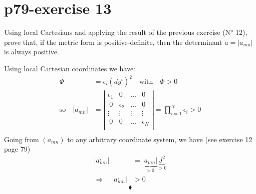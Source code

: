 \section{p79-exercise 13}
\begin{tcolorbox}
Using local Cartesians and applying the result of the previous exercise (N° 12), prove that, if the metric form is positive-definite, then the determinant $a= \left | a_{mn} \right |$ is always positive.
\end{tcolorbox}
Using local Cartesian coordinates we have:
\begin{align}
\Phi &= \epsilon_i (dy^i)^2 \quad \text{with} \quad \Phi > 0\\
\text{so}\quad \left | a_{mn} \right |  &= \left | \begin{array}{cccc}  
\epsilon_1&0&\dots & 0\\
\ 0&\epsilon_2&\dots & 0\\
\vdots&\vdots&\vdots & \vdots\\
\ 0&0&\dots & \epsilon_N\\
\end{array} \right | = \prod_{i=1}^{N}\epsilon_i >0\\
\end{align}
Going from $\left( a_{mn} \right)$ to any arbitrary coordinate system, we have (see exercise 12 page 79) 
\begin{align}
\left | a^,_{mn} \right | &= \underbrace{\left | a_{mn} \right |}_{>0}\underbrace{J^2}_{>0}\\
\Rightarrow \quad\left | a^,_{mn} \right | &>0
\end{align}
$$\blacklozenge$$
\newpage

